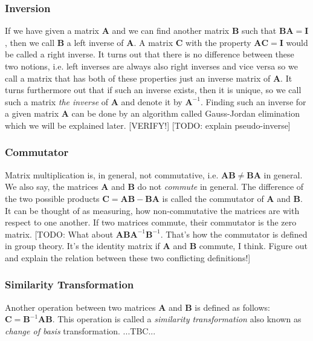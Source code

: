\subsubsection{Inversion}
If we have given a matrix $\mathbf{A}$ and we can find another matrix $\mathbf{B}$ such that  $\mathbf{B} \mathbf{A} = \mathbf{I}$, then we call $\mathbf{B}$ a left inverse of $\mathbf{A}$. A matrix $\mathbf{C}$ with the property $\mathbf{A} \mathbf{C} = \mathbf{I}$ would be called a right inverse. It turns out that there is no difference between these two notions, i.e. left inverses are always also right inverses and vice versa so we call a matrix that has both of these properties just an inverse matrix of $\mathbf{A}$. It turns furthermore out that if such an inverse exists, then it is unique, so we call such a matrix \emph{the inverse} of $\mathbf{A}$ and denote it by $\mathbf{A}^{-1}$. Finding such an inverse for a given matrix $\mathbf{A}$ can be done by an algorithm called Gauss-Jordan elimination which we will be explained later. [VERIFY!] [TODO: explain pseudo-inverse]



\subsubsection{Commutator}
Matrix multiplication is, in general, not commutative, i.e. $\mathbf{A} \mathbf{B} \neq \mathbf{B} \mathbf{A}$ in general. We also say, the matrices  $\mathbf{A}$ and $\mathbf{B}$ do not \emph{commute} in general. The difference of the two possible products $\mathbf{C} = \mathbf{A} \mathbf{B} - \mathbf{B} \mathbf{A}$ is called the commutator of $\mathbf{A}$ and $\mathbf{B}$. It can be thought of as measuring, how non-commutative the matrices are with respect to one another. If two matrices commute, their commutator is the zero matrix. [TODO: What about $\mathbf{A} \mathbf{B} \mathbf{A}^{-1} \mathbf{B}^{-1}$. That's how the commutator is defined in group theory. It's the identity matrix if  $\mathbf{A}$ and $\mathbf{B}$ commute, I think. Figure out and explain the relation between these two conflicting definitions!]

\subsubsection{Similarity Transformation}
Another operation between two matrices $\mathbf{A}$ and $\mathbf{B}$ is defined as follows: $\mathbf{C} = \mathbf{B}^{-1} \mathbf{A} \mathbf{B}$. This operation is called a \emph{similarity transformation} also known as \emph{change of basis} transformation. ...TBC...



